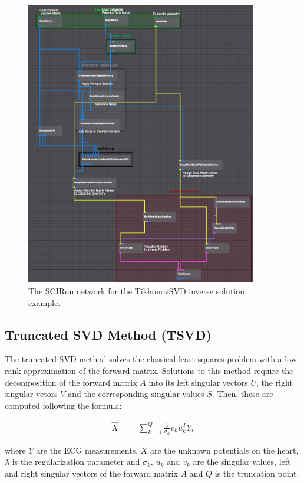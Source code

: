     
    \begin{figure}
        \begin{center}
        \includegraphics[width=0.9\textwidth]{ECGToolkitGuide_figures/TikhonovSVDNetwork.png}
        \caption{The SCIRun network for the TikhonovSVD inverse solution example.}
        \label{fig:TikhonovNetworkExampleSVD}
        \end{center}
    \end{figure}


  
\subsection{Truncated SVD Method (TSVD)}
    
    The truncated SVD method solves the classical least-squares problem with a low-rank approximation of the forward matrix. 
    Solutions to this method require the decomposition of the forward matrix $A$ into its left singular vectors $U$, the right singular vetors $V$ and the corresponding singular values $S$. 
    Then, these are computed following the formula:
    \begin{center}
    \begin{eqnarray}
        \hat{X}   &=& \sum_{k=1}^Q \frac{1}{\sigma_k} v_k u_k^T Y,
    \label{eq:inverseSec_TikhonovSolutions1}
    \end{eqnarray}
    \end{center} 
    where $Y$ are the ECG measurements, $X$ are the unknown potentials on the heart, $\lambda$ is the regularization parameter and $\sigma_k$, $u_k$ and $v_k$ are the singular values, left and right singular vectors of the forward matrix $A$ and $Q$ is the truncation point.
    
